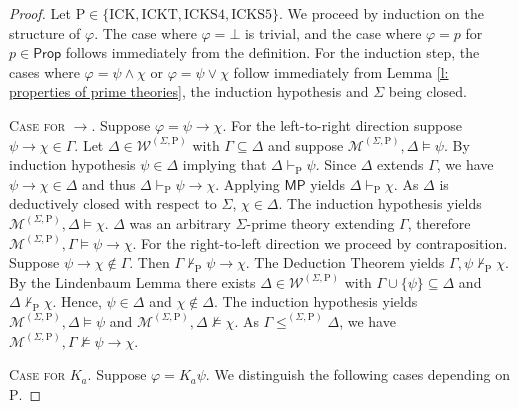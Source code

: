 \documentclass[10pt,a4paper]{amsart}
\newcommand{\K}{K}
\newcommand\Prop {\mathsf{Prop}}
\newcommand{\W}{\mathcal{W}}
\newcommand{\agi}{a}
\newcommand{\fw}{\mathcal{M}}
\newcommand{\hick}{\mathrm{ICK}}
\newcommand{\hickp}{\mathrm{P}}
\newcommand{\hicks}{\mathrm{ICKS4}}
\newcommand{\hickss}{\mathrm{ICKS5}}
\newcommand{\hickt}{\mathrm{ICKT}}
\begin{document}
\begin{proof}
    Let $\hickp \in \{\hick, \hickt, \hicks, \hickss\}$. We proceed by induction on the structure of $\varphi$. The case where $\varphi = \bot$ is trivial, and the case where $\varphi = p$ for $p \in \Prop$ follows immediately from the definition. For the induction step, the cases where $\varphi = \psi \wedge \chi$ or $\varphi = \psi \vee \chi$ follow immediately from Lemma \ref{l: properties of prime theories}, the induction hypothesis and $\Sigma$ being closed. \smallskip
    
    \noindent \textsc{Case for $\rightarrow$.} Suppose $\varphi = \psi \rightarrow \chi$. For the left-to-right direction suppose $\psi \rightarrow \chi \in \Gamma$. Let $\Delta \in \W^{(\Sigma, \hickp)}$ with $\Gamma \subseteq \Delta$ and suppose $\fw^{(\Sigma, \hickp)}, \Delta \models \psi$. By induction hypothesis $\psi \in \Delta$ implying that $\Delta \vdash_\mathrm{P} \psi$. Since $\Delta$ extends $\Gamma$, we have $\psi \rightarrow \chi \in \Delta$ and thus $\Delta \vdash_\mathrm{P} \psi \rightarrow \chi$. Applying $\mathsf{MP}$ yields $\Delta \vdash_\mathrm{P} \chi$. As $\Delta$ is deductively closed with respect to $\Sigma$, $\chi \in \Delta$. The induction hypothesis yields $\fw^{(\Sigma, \hickp)}, \Delta \models \chi$. $\Delta$ was an arbitrary $\Sigma$-prime theory extending $\Gamma$, therefore $\fw^{(\Sigma, \hickp)}, \Gamma \models \psi \rightarrow \chi$. 
    For the right-to-left direction we proceed by contraposition. Suppose $\psi \rightarrow \chi \not \in \Gamma$. Then $\Gamma \not \vdash_\mathrm{P} \psi \rightarrow \chi$. The Deduction Theorem yields $\Gamma, \psi \not \vdash_\mathrm{P} \chi$. By the Lindenbaum Lemma there exists $\Delta \in \W^{(\Sigma, \hickp)}$ with $\Gamma \cup \{\psi\} \subseteq \Delta$ and $\Delta \not \vdash_\mathrm{P} \chi$. Hence, $\psi \in \Delta$ and $\chi \not \in \Delta$. The induction hypothesis yields $\fw^{(\Sigma, \hickp)}, \Delta \models \psi$ and $\fw^{(\Sigma, \hickp)}, \Delta \not \models \chi$. As $\Gamma \leq^{(\Sigma, \hickp)} \Delta$, we have $\fw^{(\Sigma, \hickp)}, \Gamma \not \models \psi \rightarrow \chi$. \smallskip
    
    \noindent \textsc{Case for $\K_\agi$.} Suppose $\varphi = \K_\agi \psi$. We distinguish the following cases depending on $\hickp$. \smallskip
   

\end{proof}
\end{document}
